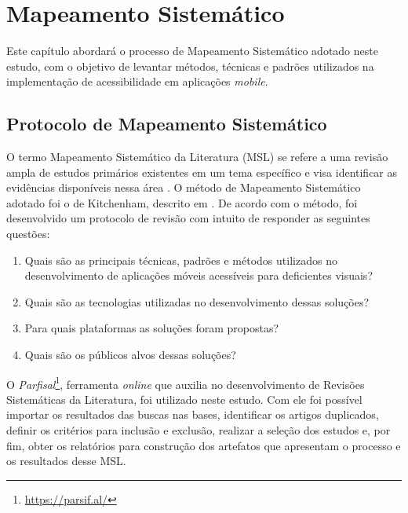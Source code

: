 \chapter{Mapeamento Sistemático}
Este capítulo abordará o processo de Mapeamento Sistemático adotado neste estudo, com o objetivo de levantar métodos, técnicas e padrões utilizados na implementação de acessibilidade em aplicações \emph{mobile}.


\section{Protocolo de Mapeamento Sistemático}
O termo Mapeamento Sistemático da Literatura (MSL) se refere a uma revisão ampla de estudos primários existentes em um tema específico e visa identificar as evidências disponíveis nessa área \cite{Kitchenham2007}.
O método de Mapeamento Sistemático adotado foi o de Kitchenham, descrito em .
De acordo com o método, foi desenvolvido um protocolo de revisão com intuito de responder as seguintes questões:
\begin{enumerate}
\item Quais são as principais técnicas, padrões e métodos utilizados no desenvolvimento de aplicações móveis acessíveis para deficientes visuais?
\item Quais são as tecnologias utilizadas no desenvolvimento dessas soluções?
\item Para quais plataformas as soluções foram propostas?
\item Quais são os públicos alvos dessas soluções?
\end{enumerate}

O \emph{Parfisal}\footnote{\url{https://parsif.al/}}, ferramenta \emph{online} que auxilia no desenvolvimento de Revisões Sistemáticas da Literatura, foi utilizado neste estudo.
Com ele foi possível importar os resultados das buscas nas bases, identificar os artigos duplicados, definir os critérios para inclusão e exclusão, realizar a seleção dos estudos e, por fim, obter os relatórios para construção dos artefatos que apresentam o processo e os resultados desse MSL.

